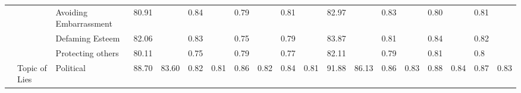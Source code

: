 \begin{table}[!tbh]
{\begin{tabular}{l|l|l|llllllll||llllllll}
                       &                                 & Avoiding Embarrassment  & \multicolumn{1}{l|}{80.91} & \multicolumn{1}{l|}{}                       & \multicolumn{1}{l|}{0.84} & \multicolumn{1}{l|}{}                      & \multicolumn{1}{l|}{0.79} & \multicolumn{1}{l|}{}                      & \multicolumn{1}{l|}{0.81} &                       & \multicolumn{1}{l|}{82.97} & \multicolumn{1}{l|}{}                       & \multicolumn{1}{l|}{0.83} & \multicolumn{1}{l|}{}                      & \multicolumn{1}{l|}{0.80} & \multicolumn{1}{l|}{}                      & \multicolumn{1}{l|}{0.81} &                       \\ \cline{3-4} \cline{6-6} \cline{8-8} \cline{10-10} \cline{12-12} \cline{14-14} \cline{16-16} \cline{18-18}
                       &                                 & Defaming Esteem         & \multicolumn{1}{l|}{82.06} & \multicolumn{1}{l|}{}                       & \multicolumn{1}{l|}{0.83} & \multicolumn{1}{l|}{}                      & \multicolumn{1}{l|}{0.75} & \multicolumn{1}{l|}{}                      & \multicolumn{1}{l|}{0.79} &                       & \multicolumn{1}{l|}{83.87} & \multicolumn{1}{l|}{}                       & \multicolumn{1}{l|}{0.81} & \multicolumn{1}{l|}{}                      & \multicolumn{1}{l|}{0.84} & \multicolumn{1}{l|}{}                      & \multicolumn{1}{l|}{0.82} &                       \\ \cline{3-4} \cline{6-6} \cline{8-8} \cline{10-10} \cline{12-12} \cline{14-14} \cline{16-16} \cline{18-18}
                       &                                 & Protecting others       & \multicolumn{1}{l|}{80.11} & \multicolumn{1}{l|}{}                       & \multicolumn{1}{l|}{0.75} & \multicolumn{1}{l|}{}                      & \multicolumn{1}{l|}{0.79} & \multicolumn{1}{l|}{}                      & \multicolumn{1}{l|}{0.77} &                       & \multicolumn{1}{l|}{82.11} & \multicolumn{1}{l|}{}                       & \multicolumn{1}{l|}{0.79} & \multicolumn{1}{l|}{}                      & \multicolumn{1}{l|}{0.81} & \multicolumn{1}{l|}{}                      & \multicolumn{1}{l|}{0.8}  &                       \\ \cline{2-19} 
                       & \multirow{6}{*}{Topic of Lies} & Political               & \multicolumn{1}{l|}{88.70} & \multicolumn{1}{l|}{\multirow{6}{*}{83.60}} & \multicolumn{1}{l|}{0.82} & \multicolumn{1}{l|}{\multirow{6}{*}{0.81}} & \multicolumn{1}{l|}{0.86} & \multicolumn{1}{l|}{\multirow{6}{*}{0.82}} & \multicolumn{1}{l|}{0.84} & \multirow{6}{*}{0.81} & \multicolumn{1}{l|}{91.88} & \multicolumn{1}{l|}{\multirow{6}{*}{86.13}} & \multicolumn{1}{l|}{0.86} & \multicolumn{1}{l|}{\multirow{6}{*}{0.83}} & \multicolumn{1}{l|}{0.88} & \multicolumn{1}{l|}{\multirow{6}{*}{0.84}} & \multicolumn{1}{l|}{0.87} & \multirow{6}{*}{0.83} \\ \cline{3-4} \cline{6-6} \cline{8-8} \cline{10-10} \cline{12-12} \cline{14-14} \cline{16-16} \cline{18-18}

\end{tabular}}
\end{table}
